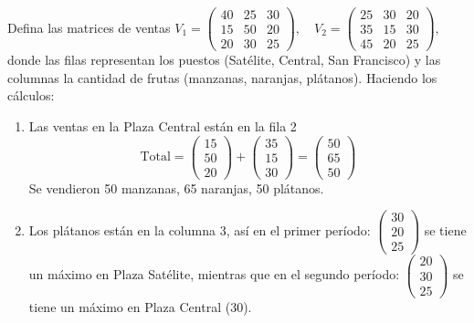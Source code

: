 \begin{myproof}
Defina las matrices de ventas \(
V_1 = \begin{pmatrix}
40 & 25 & 30 \\
15 & 50 & 20 \\
20 & 30 & 25
\end{pmatrix}, \quad 
V_2 = \begin{pmatrix}
25 & 30 & 20 \\
35 & 15 & 30 \\
45 & 20 & 25
\end{pmatrix}
,\) donde las filas representan los puestos (Satélite, Central, San Francisco) y las columnas la cantidad de frutas (manzanas, naranjas, plátanos). Haciendo los cálculos:

\begin{enumerate}[$(a)$]
\item Las ventas en la Plaza Central están en la fila 2
\[
\text{Total} = \begin{pmatrix} 15 \\ 50 \\ 20 \end{pmatrix} + \begin{pmatrix} 35 \\ 15 \\ 30 \end{pmatrix} = \begin{pmatrix} 50 \\ 65 \\ 50 \end{pmatrix}
\]
Se vendieron 50 manzanas, 65 naranjas, 50 plátanos.

\item Los plátanos están en la columna 3, así en el primer período: $\begin{pmatrix} 30 \\ 20 \\ 25 \end{pmatrix}$ se tiene un máximo en Plaza Satélite, mientras que en el segundo período: $\begin{pmatrix} 20 \\ 30 \\ 25 \end{pmatrix}$ se tiene un máximo en Plaza Central (30).


\end{enumerate}
\end{myproof}
